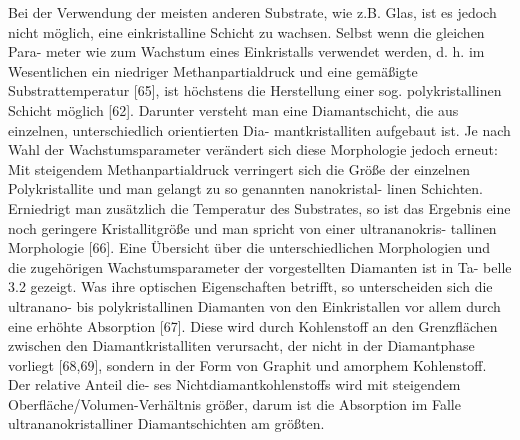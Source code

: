       Bei der Verwendung der meisten anderen Substrate, wie z.B. Glas, ist es jedoch nicht möglich, eine einkristalline Schicht zu wachsen. Selbst wenn die gleichen Para- meter wie zum Wachstum eines Einkristalls verwendet werden, d. h. im Wesentlichen ein niedriger Methanpartialdruck und eine gemäßigte Substrattemperatur [65], ist höchstens die Herstellung einer sog. polykristallinen Schicht möglich [62]. Darunter versteht man eine Diamantschicht, die aus einzelnen, unterschiedlich orientierten Dia- mantkristalliten aufgebaut ist. Je nach Wahl der Wachstumsparameter verändert sich diese Morphologie jedoch erneut: Mit steigendem Methanpartialdruck verringert sich die Größe der einzelnen Polykristallite und man gelangt zu so genannten nanokristal- linen Schichten. Erniedrigt man zusätzlich die Temperatur des Substrates, so ist das Ergebnis eine noch geringere Kristallitgröße und man spricht von einer ultrananokris- tallinen Morphologie [66]. Eine Übersicht über die unterschiedlichen Morphologien und die zugehörigen Wachstumsparameter der vorgestellten Diamanten ist in Ta- belle 3.2 gezeigt. Was ihre optischen Eigenschaften betrifft, so unterscheiden sich die ultranano- bis polykristallinen Diamanten von den Einkristallen vor allem durch eine erhöhte Absorption [67]. Diese wird durch Kohlenstoff an den Grenzflächen zwischen den Diamantkristalliten verursacht, der nicht in der Diamantphase vorliegt [68,69], sondern in der Form von Graphit und amorphem Kohlenstoff. Der relative Anteil die- ses Nichtdiamantkohlenstoffs wird mit steigendem Oberfläche/Volumen-Verhältnis größer, darum ist die Absorption im Falle ultrananokristalliner Diamantschichten am größten.

\section{\sivs} \label{sec::siv}

